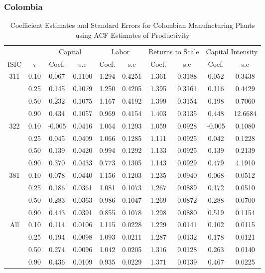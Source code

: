 \documentclass[11pt]{article}
\begin{document}
\subsubsection{Colombia}
\begin{table}[H]
\centering
\caption{Coefficient Estimates and Standard Errors for Colombian Manufacturing Plants using ACF Estimates of Productivity}
\begin{tabular}{cccccccccc}
  \hline\hline & & \multicolumn{2}{c}{Capital}  & \multicolumn{2}{c}{Labor} & \multicolumn{2}{c}{Returns to Scale} & \multicolumn{2}{c}{Capital Intensity}\\ \cmidrule(lr){3-4} \cmidrule(lr){5-6} \cmidrule(lr){7-8} \cmidrule(lr){9-10}ISIC & $\tau$ & Coef. & s.e & Coef. & s.e & Coef. & s.e & Coef. & s.e \\ 
  \hline
311 & 0.10 & 0.067 & 0.1100 & 1.294 & 0.4251 & 1.361 & 0.3188 & 0.052 & 0.3438 \\ 
   & 0.25 & 0.145 & 0.1079 & 1.250 & 0.4205 & 1.395 & 0.3161 & 0.116 & 0.4429 \\ 
   & 0.50 & 0.232 & 0.1075 & 1.167 & 0.4192 & 1.399 & 0.3154 & 0.198 & 0.7060 \\ 
   & 0.90 & 0.434 & 0.1057 & 0.969 & 0.4154 & 1.403 & 0.3135 & 0.448 & 12.6684 \\ 
  322 & 0.10 & -0.005 & 0.0416 & 1.064 & 0.1293 & 1.059 & 0.0928 & -0.005 & 0.1080 \\ 
   & 0.25 & 0.045 & 0.0409 & 1.066 & 0.1285 & 1.111 & 0.0925 & 0.042 & 0.1228 \\ 
   & 0.50 & 0.139 & 0.0420 & 0.994 & 0.1292 & 1.133 & 0.0925 & 0.139 & 0.2139 \\ 
   & 0.90 & 0.370 & 0.0433 & 0.773 & 0.1305 & 1.143 & 0.0929 & 0.479 & 4.1910 \\ 
  381 & 0.10 & 0.078 & 0.0440 & 1.156 & 0.1203 & 1.235 & 0.0940 & 0.068 & 0.0512 \\ 
   & 0.25 & 0.186 & 0.0361 & 1.081 & 0.1073 & 1.267 & 0.0889 & 0.172 & 0.0510 \\ 
   & 0.50 & 0.283 & 0.0363 & 0.986 & 0.1047 & 1.269 & 0.0872 & 0.288 & 0.0700 \\ 
   & 0.90 & 0.443 & 0.0391 & 0.855 & 0.1078 & 1.298 & 0.0880 & 0.519 & 0.1154 \\ 
  All & 0.10 & 0.114 & 0.0106 & 1.115 & 0.0228 & 1.229 & 0.0141 & 0.102 & 0.0115 \\ 
   & 0.25 & 0.194 & 0.0098 & 1.093 & 0.0211 & 1.287 & 0.0132 & 0.178 & 0.0121 \\ 
   & 0.50 & 0.274 & 0.0096 & 1.042 & 0.0205 & 1.316 & 0.0128 & 0.263 & 0.0140 \\ 
   & 0.90 & 0.436 & 0.0109 & 0.935 & 0.0229 & 1.371 & 0.0139 & 0.467 & 0.0225 \\ 
   \hline
\end{tabular}
\label{COLestACF}
\end{table}
\end{document}
